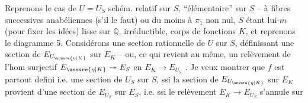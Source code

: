 Reprenons le cas de $U=U_S$ schém. relatif sur $S$, ``élémentaire'' sur $S$ -- à fibres successives anabéliennes (s'il le faut) ou du moins à $\pi_1$ non nul, $S$ étant lui-$\overline m$ (pour fixer les idées) lisse sur $\mathbb{Q}$, irréductible, corps de fonctions $K$, et reprenons le diagramme 5. Considérons une section rationnelle  de $U$ sur $S$, définissant une section de $E_{U_{\unsure{\eta|K}}}$ sur $E_K$ -- ou, ce qui revient au même, un relèvement de l'hom surjectif $E_{\unsure{\eta|K}}\twoheadrightarrow E_S$ en $E_K\longrightarrow E_{U_S}$ . Je veux montrer que $f$ est partout defini i.e. une section  de $U_S$ sur $S$, ssi la section de $E_{U_{\unsure{\eta|K}}}$ sur $E_K$ provient d'une section de $E_{U_S}$ sur $E_S$, i.e. ssi le relèvement $E_K\longrightarrow E_{U_S}$ s'annule sur
